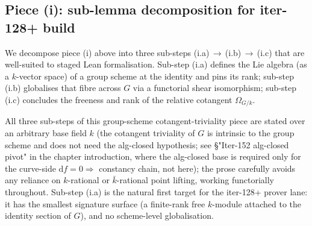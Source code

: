 \subsection{Piece (i): sub-lemma decomposition for iter-128+ build}
\label{subsec:RigidityKbar_piece_i_decomposition}

We decompose piece (i) above into three sub-steps (i.a)\,\(\to\)\,(i.b)\,\(\to\)\,(i.c) that are well-suited to staged Lean formalisation. Sub-step (i.a) defines the Lie algebra (as a \(k\)-vector space) of a group scheme at the identity and pins its rank; sub-step (i.b) globalises that fibre across \(G\) via a functorial shear isomorphism; sub-step (i.c) concludes the freeness and rank of the relative cotangent \(\Omega_{G/k}\).

All three sub-steps of this group-scheme cotangent-triviality piece are stated over an arbitrary base field \(k\) (the cotangent triviality of \(G\) is intrinsic to the group scheme and does not need the alg-closed hypothesis; see \S "Iter-152 alg-closed pivot" in the chapter introduction, where the alg-closed base is required only for the curve-side \(\mathrm df = 0 \Rightarrow\) constancy chain, not here); the prose carefully avoids any reliance on \(k\)-rational or \(\bar k\)-rational point lifting, working functorially throughout. Sub-step (i.a) is the natural first target for the iter-128+ prover lane: it has the smallest signature surface (a finite-rank free \(k\)-module attached to the identity section of \(G\)), and no scheme-level globalisation.


